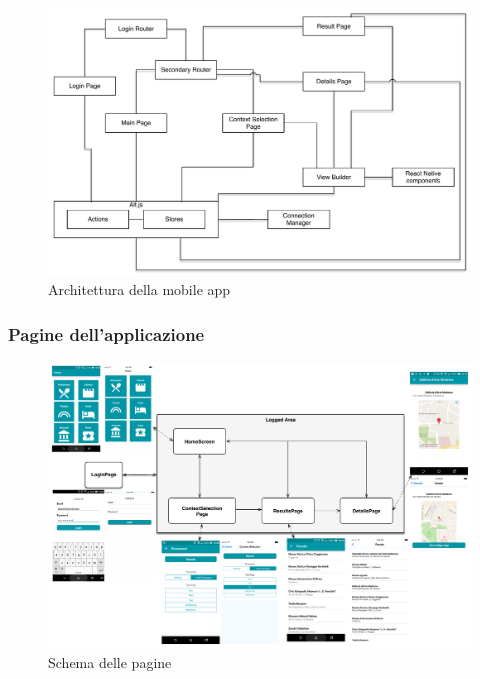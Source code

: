 \begin{figure}[h]
	\centering
	\includegraphics[width=\textwidth]{4-progettazione-alto-livello/Immagini/app_architecture.pdf}
	\caption{Architettura della mobile app}\label{fig:app-architecture}
\end{figure}

\subsubsection{Pagine dell'applicazione}

\begin{figure}[p]
	\centering
	\includegraphics[height=\textwidth, angle=90]{4-progettazione-alto-livello/Immagini/screen_schema.pdf}
	\caption{Schema delle pagine}\label{fig:screen-schema}
\end{figure}

